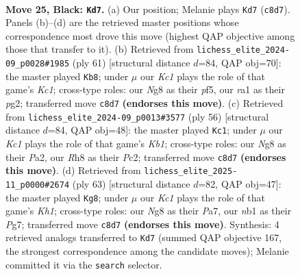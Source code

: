 \documentclass[11pt]{article}
\begin{document}
\clearpage

\begin{figure}[p]\centering
\begin{subfigure}{0.46\textwidth}\centering
\resizebox{\linewidth}{!}{%
\newchessgame
\chessboard[
  setfen={2k3nr/2r3p1/Q7/2p3Pp/5P1P/2P5/PP3K2/RNB4q b - - 0 25},
  showmover=false,
  pgfstyle=straightmove, color=movearrow, markmove={c8-d7}
]}
\caption{}
\end{subfigure}\hfill
\begin{subfigure}{0.46\textwidth}\centering
\resizebox{\linewidth}{!}{%
\newchessgame
\chessboard[
  setfen={r1k5/1p6/4Qp2/r3pP2/4P3/1PP5/1P3qPP/1K2R3 b - - 2 31},
  showmover=false,
  pgfstyle=straightmove, color=movearrow, markmove={c8-b8}
]}
\caption{}
\end{subfigure}
\\[4pt]
\begin{subfigure}{0.46\textwidth}\centering
\resizebox{\linewidth}{!}{%
\newchessgame
\chessboard[
  setfen={8/4prk1/p2p1p2/1p3PpQ/1q6/6P1/P1P5/1K5R w - - 0 29},
  showmover=false,
  pgfstyle=straightmove, color=movearrow, markmove={b1-c1}
]}
\caption{}
\end{subfigure}\hfill
\begin{subfigure}{0.46\textwidth}\centering
\resizebox{\linewidth}{!}{%
\newchessgame
\chessboard[
  setfen={3r3k/ppp3p1/4P3/4P2Q/5q2/4R2P/PP1r2P1/2N3K1 b - - 1 32},
  showmover=false,
  pgfstyle=straightmove, color=movearrow, markmove={h8-g8}
]}
\caption{}
\end{subfigure}
\caption{\textbf{Move 25, Black: \texttt{Kd7}.} (a) Our position; Melanie plays \texttt{Kd7} (\texttt{c8d7}). Panels (b)--(d) are the retrieved master positions whose correspondence most drove this move (highest QAP objective among those that transfer to it). (b) Retrieved from \texttt{lichess\_elite\_2024-09\_p0028\#1985} (ply 61) [structural distance $d$=84, QAP obj=70]: the master played \texttt{Kb8}; under $\mu$ our \emph{Kc1} plays the role of that game's \emph{Kc1}; cross-type roles: our \emph{N}g8 as their \emph{p}f5, our \emph{r}a1 as their \emph{p}g2; transferred move \texttt{c8d7} \textbf{(endorses this move)}. (c) Retrieved from \texttt{lichess\_elite\_2024-09\_p0013\#3577} (ply 56) [structural distance $d$=84, QAP obj=48]: the master played \texttt{Kc1}; under $\mu$ our \emph{Kc1} plays the role of that game's \emph{Kb1}; cross-type roles: our \emph{N}g8 as their \emph{P}a2, our \emph{R}h8 as their \emph{P}c2; transferred move \texttt{c8d7} \textbf{(endorses this move)}. (d) Retrieved from \texttt{lichess\_elite\_2025-11\_p0000\#2674} (ply 63) [structural distance $d$=82, QAP obj=47]: the master played \texttt{Kg8}; under $\mu$ our \emph{Kc1} plays the role of that game's \emph{Kh1}; cross-type roles: our \emph{N}g8 as their \emph{P}a7, our \emph{n}b1 as their \emph{P}g7; transferred move \texttt{c8d7} \textbf{(endorses this move)}. Synthesis: 4 retrieved analogs transferred to \texttt{Kd7} (summed QAP objective 167, the strongest correspondence among the candidate moves); Melanie committed it via the \texttt{search} selector.}
\label{fig:thought-m49}
\end{figure}
\end{document}
